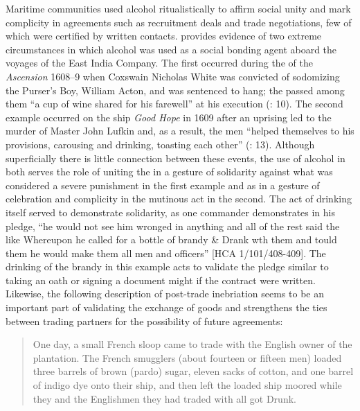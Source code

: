 Maritime communities used alcohol ritualistically to affirm social unity and mark complicity in agreements such as recruitment deals and trade negotiations, few of which were certified by written contacts. \citet{Fury2015} provides evidence of two extreme circumstances in which alcohol was used as a social bonding agent aboard the voyages of the East India Company. The first occurred during the  of the \textit{Ascension} 1608--9 when Coxswain Nicholas White was convicted of sodomizing the Purser’s Boy, William Acton, and was sentenced to hang; the  passed among them “a cup of wine shared for his farewell” at his execution (\citealt{Fury2015}: 10). The second example occurred on the ship \textit{Good Hope} in 1609 after an uprising led to the murder of Master John Lufkin and, as a result, the men “helped themselves to his provisions, carousing and drinking, toasting each other” (\citealt{Fury2015}: 13). Although superficially there is little connection between these events, the use of alcohol in both serves the role of uniting the  in a gesture of solidarity against what was considered a severe punishment in the first example and as in a gesture of celebration and complicity in the mutinous act in the second. The act of drinking itself served to demonstrate solidarity, as one commander demonstrates in his pledge, “he would not see him wronged in anything and all of the rest said the like Whereupon he called for a bottle of brandy \& Drank wth them and tould them he would make them all men and officers” [HCA 1/101/408-409]. The drinking of the brandy in this example acts to validate the pledge similar to taking an oath or signing a document might if the contract were written. Likewise, the following description of post-trade inebriation seems to be an important part of validating the exchange of goods and strengthens the ties between trading partners for the possibility of future agreements:

\begin{quotation}
One day, a small French sloop came to trade with the English owner of the plantation.  The French smugglers (about fourteen or fifteen men) loaded three barrels of brown (pardo) sugar, eleven sacks of cotton, and one barrel of indigo dye onto their ship, and then left the loaded ship moored while they and the Englishmen they had traded with all got Drunk. \citep[15]{Hatfield2016} 
\end{quotation}

